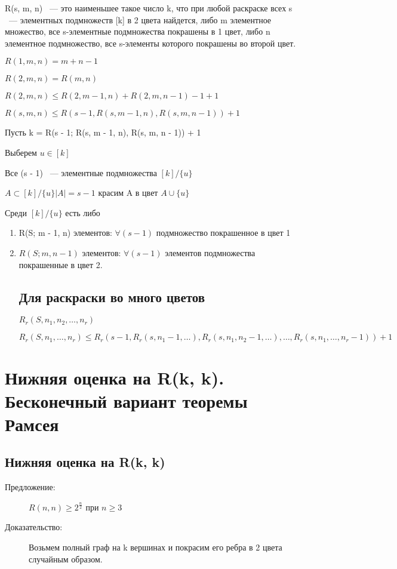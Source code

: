 \documentclass[12pt]{article}
\begin{document}
\begin{description}
R(s, m, n) ~--- это наименьшее такое число k, что при любой раскраске всех s ~--- элементных подмножеств [k] в 2 цвета найдется, либо m элементное множество, все s-элементные подмножества покрашены в 1 цвет, либо n элементное подмножество, все s-элементы которого покрашены во второй цвет. 

$R(1, m, n) = m + n - 1$

$R(2, m, n) = R(m, n)$ 

$R(2, m, n) \le R(2, m -1, n) + R(2, m, n - 1) - 1 + 1$

$R(s, m, n) \le R(s - 1, R(s, m - 1, n), R(s, m, n - 1)) + 1$

Пусть k  = R(s - 1; R(s, m - 1, n), R(s, m, n - 1)) + 1

Выберем $u \in [k]$

Все (s - 1) ~--- элементные подмножества $[k]/\{u\}$

$A \subset [k]/\{u\} |A| = s - 1$ красим A в цвет $A \cup \{u\}$

Среди $[k] /\{u\}$ есть либо 
\begin{enumerate}
\item R(S; m - 1, n) элементов: $\forall (s - 1)$ подмножество покрашенное в цвет 1
\item $R(S; m, n - 1)$ элементов: $\forall (s - 1)$ элементов подмножества покрашенные в цвет 2.

\subsection{Для раскраски во много цветов}

$R_r(S, n_1, n_2, \ldots, n_r)$

$R_r(S, n_1, \ldots, n_r) \le R_r(s - 1, R_r(s, n_1 - 1, \ldots), R_r(s, n_1, n_2 - 1, \ldots), \ldots, R_r(s, n_1, \ldots, n_r - 1)) + 1$
\end{enumerate}

\section{Нижняя оценка на R(k, k). Бесконечный вариант теоремы Рамсея}

\subsection{Нижняя оценка на R(k, k)}

\begin{description}
\item[Предложение:] $R(n, n) \ge 2^{\frac{n}{2}}$ при $n \ge 3$
\item[Доказательство:] Возьмем полный граф на k вершинах и покрасим его ребра в 2 цвета случайным образом. 


\end{description}
\end{description}
\end{document}
